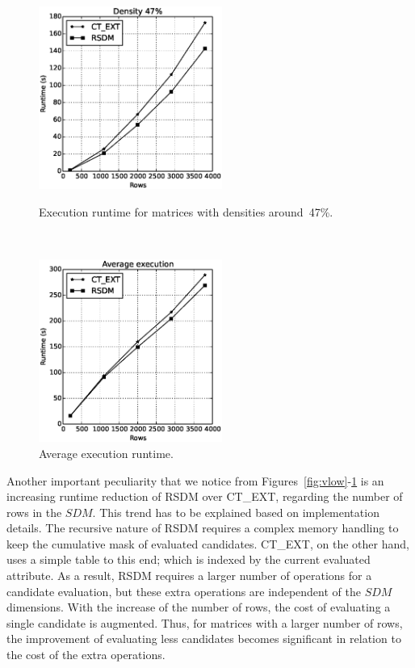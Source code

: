 \documentclass[authoryear,11pt]{elsarticle}
\begin{document}
	\begin{figure}[htb]
	\centering
	\begin{minipage}{.45\textwidth}
	  \centering
	   \includegraphics[width=6cm , height=6cm]{med_density1.eps}
	  \caption{Execution runtime for matrices with densities around~47\%.}
	  \label{fig:med}
	\end{minipage}%
	~~~
	\begin{minipage}{.45\textwidth}
	  \centering
	   \includegraphics[width=6cm , height=6cm]{average.eps}
	  \caption{Average execution runtime.}
	  \label{fig:average}
	\end{minipage}
	\end{figure}	
	
	Another important peculiarity that we notice from Figures~\ref{fig:vlow}-\ref{fig:average} is an increasing runtime reduction
	of RSDM over CT\_EXT, regarding the number of rows in the $SDM$. This trend has to be explained based on implementation
	details. The recursive nature of RSDM requires a complex memory handling to keep the cumulative mask of evaluated 
	candidates. CT\_EXT, on the other hand, uses a simple table to this end; which is indexed by the current evaluated
	attribute. As a result, RSDM requires a larger number of operations for a candidate evaluation, but these extra operations 
	are independent of the $SDM$ dimensions. With the increase of the number of rows, the cost of evaluating a single candidate
	is augmented. Thus, for matrices with a larger number of rows, the improvement of evaluating less candidates becomes significant
	in relation to the cost of the extra operations.	
	
\end{document}
